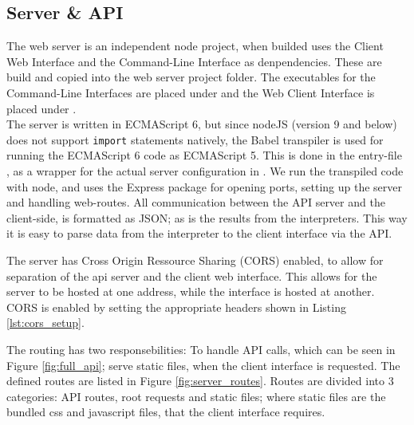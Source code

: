 \subsection*{Server \& API}
%

The web server is an independent node project, when builded uses the Client Web Interface and the Command-Line Interface as denpendencies.
These are build and copied into the web server project folder.
The executables for the Command-Line Interfaces are placed under  and the Web Client Interface is placed under .\\

\noindent
The server is written in ECMAScript 6, but since nodeJS (version 9 and below) does not support \texttt{import} statements natively, the Babel transpiler is used for running the ECMAScript 6 code as ECMAScript 5.
This is done in the entry-file , as a wrapper for the actual server configuration in .
We run the transpiled code with node, and uses the Express package for opening ports, setting up the server and handling web-routes.
All communication between the API server and the client-side, is formatted as JSON; as is the results from the interpreters.
This way it is easy to parse data from the interpreter to the client interface via the API.

The server has Cross Origin Ressource Sharing (CORS) enabled, to allow for separation of the api server and the client web interface.
This allows for the server to be hosted at one address, while the interface is hosted at another.
CORS is enabled by setting the appropriate headers shown in Listing \ref{lst:cors_setup}.



The routing has two responsebilities: To handle API calls, which can be seen in Figure \ref{fig:full_api}; serve static files, when the client interface is requested. The defined routes are listed in Figure \ref{fig:server_routes}. Routes are divided into 3 categories: API routes, root requests and static files; where static files are the bundled css and javascript files, that the client interface requires.\\

